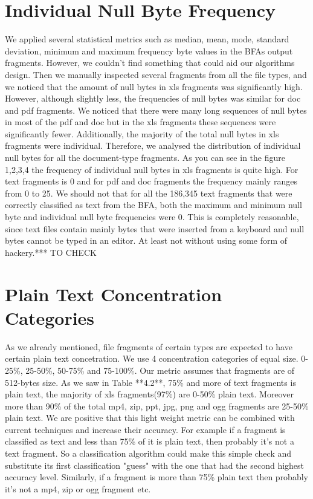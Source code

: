 \section{Individual Null Byte Frequency}
We applied several statistical metrics such as median, mean, mode, standard deviation, minimum and maximum frequency byte values in the BFAs output fragments. However, we couldn't find something that could aid our algorithms design. Then we manually inspected several fragments from all the file types, and we noticed that the amount of null bytes in xls fragments was significantly high. However, although slightly less, the frequencies of null bytes was similar for doc and pdf fragments. We noticed that there were many long sequences of null bytes in most of the pdf and doc but in the xls fragments these sequences were significantly fewer. Additionally, the majority of the total null bytes in xls fragments were individual. Therefore, we analysed the distribution of individual null bytes for all the document-type fragments. As you can see in the figure 1,2,3,4 the frequency of individual null bytes in xls fragments is quite high. For text fragments is 0 and for pdf and doc fragments the frequency mainly ranges from 0 to 25. We should not that for all the 186,345 text fragments that were correctly classified as text from the BFA, both the maximum and minimum null byte and individual null byte frequencies were 0. This is completely reasonable, since text files contain mainly bytes that were inserted from a keyboard and null bytes cannot be typed in an editor. At least not without using some form of hackery.*** TO CHECK


\section{Plain Text Concentration Categories}
As we already mentioned, file fragments of certain types are expected to have certain plain text concetration. We use 4 concentration categories of equal size. 0-25\%, 25-50\%, 50-75\% and 75-100\%. Our metric assumes that fragments are of 512-bytes size. As we saw in Table **4.2**, 75\% and more of text fragments is plain text, the majority of xls fragments(97\%) are 0-50\% plain text. Moreover more than 90\% of the total mp4, zip, ppt, jpg, png and ogg fragments are 25-50\% plain text. We are positive that this light weight metric can be combined with current techniques and increase their accuracy. For example if a fragment is classified as text and less than 75\% of it is plain text, then probably it's not a text fragment. So a classification algorithm could make this simple check and substitute its first classification "guess" with the one that had the second highest accuracy level. Similarly, if a fragment is more than 75\% plain text then probably it's not a mp4, zip or ogg fragment etc.

